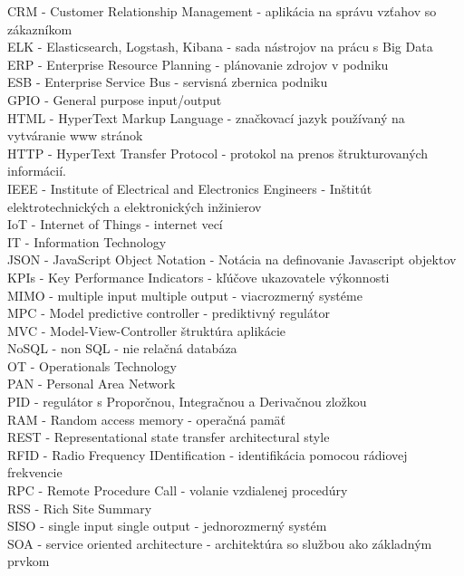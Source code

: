 CRM - Customer Relationship Management - aplikácia na správu vzťahov so zákazníkom \\
ELK - Elasticsearch, Logstash, Kibana - sada nástrojov na prácu s Big Data \\
ERP - Enterprise Resource Planning - plánovanie zdrojov v podniku \\
ESB - Enterprise Service Bus - servisná zbernica podniku \\
GPIO - General purpose input/output \\
HTML - HyperText Markup Language - značkovací jazyk používaný na vytváranie www stránok \\
HTTP - HyperText Transfer Protocol - protokol na prenos štrukturovaných informácií. \\
IEEE - Institute of Electrical and Electronics Engineers - Inštitút elektrotechnických a elektronických inžinierov \\
IoT - Internet of Things - internet vecí \\
IT - Information Technology \\
JSON - JavaScript Object Notation - Notácia na definovanie Javascript objektov \\
KPIs - Key Performance Indicators - kľúčove ukazovatele výkonnosti \\
MIMO - multiple input multiple output - viacrozmerný systéme \\
MPC - Model predictive controller - prediktivný regulátor \\
MVC - Model-View-Controller štruktúra aplikácie \\
NoSQL - non SQL - nie relačná databáza \\
OT - Operationals Technology \\
PAN - Personal Area Network \\
PID - regulátor s Proporčnou, Integračnou a Derivačnou zložkou \\
RAM - Random access memory - operačná pamäť \\
REST - Representational state transfer architectural style \\
RFID - Radio Frequency IDentification - identifikácia pomocou rádiovej frekvencie \\
RPC - Remote Procedure Call - volanie vzdialenej procedúry \\
RSS - Rich Site Summary \\
SISO - single input single output - jednorozmerný systém \\
SOA - service oriented architecture - architektúra so službou ako základným prvkom \\
